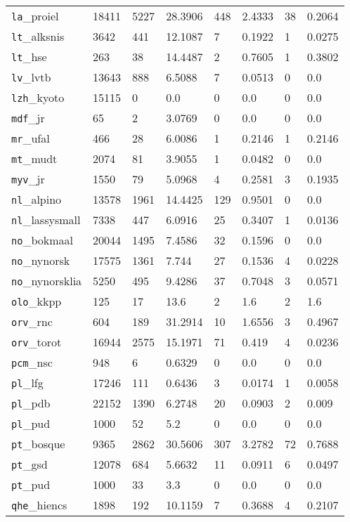 \begin{longtable}{|l|l|l|l|l|l|l|l|}
\texttt{la}\_proiel & 18411 & 5227 & 28.3906 & 448 & 2.4333 & 38 & 0.2064\\
\texttt{lt}\_alksnis & 3642 & 441 & 12.1087 & 7 & 0.1922 & 1 & 0.0275\\
\texttt{lt}\_hse & 263 & 38 & 14.4487 & 2 & 0.7605 & 1 & 0.3802\\
\texttt{lv}\_lvtb & 13643 & 888 & 6.5088 & 7 & 0.0513 & 0 & 0.0\\
\texttt{lzh}\_kyoto & 15115 & 0 & 0.0 & 0 & 0.0 & 0 & 0.0\\
\texttt{mdf}\_jr & 65 & 2 & 3.0769 & 0 & 0.0 & 0 & 0.0\\
\texttt{mr}\_ufal & 466 & 28 & 6.0086 & 1 & 0.2146 & 1 & 0.2146\\
\texttt{mt}\_mudt & 2074 & 81 & 3.9055 & 1 & 0.0482 & 0 & 0.0\\
\texttt{myv}\_jr & 1550 & 79 & 5.0968 & 4 & 0.2581 & 3 & 0.1935\\
\texttt{nl}\_alpino & 13578 & 1961 & 14.4425 & 129 & 0.9501 & 0 & 0.0\\
\texttt{nl}\_lassysmall & 7338 & 447 & 6.0916 & 25 & 0.3407 & 1 & 0.0136\\
\texttt{no}\_bokmaal & 20044 & 1495 & 7.4586 & 32 & 0.1596 & 0 & 0.0\\
\texttt{no}\_nynorsk & 17575 & 1361 & 7.744 & 27 & 0.1536 & 4 & 0.0228\\
\texttt{no}\_nynorsklia & 5250 & 495 & 9.4286 & 37 & 0.7048 & 3 & 0.0571\\
\texttt{olo}\_kkpp & 125 & 17 & 13.6 & 2 & 1.6 & 2 & 1.6\\
\texttt{orv}\_rnc & 604 & 189 & 31.2914 & 10 & 1.6556 & 3 & 0.4967\\
\texttt{orv}\_torot & 16944 & 2575 & 15.1971 & 71 & 0.419 & 4 & 0.0236\\
\texttt{pcm}\_nsc & 948 & 6 & 0.6329 & 0 & 0.0 & 0 & 0.0\\
\texttt{pl}\_lfg & 17246 & 111 & 0.6436 & 3 & 0.0174 & 1 & 0.0058\\
\texttt{pl}\_pdb & 22152 & 1390 & 6.2748 & 20 & 0.0903 & 2 & 0.009\\
\texttt{pl}\_pud & 1000 & 52 & 5.2 & 0 & 0.0 & 0 & 0.0\\
\texttt{pt}\_bosque & 9365 & 2862 & 30.5606 & 307 & 3.2782 & 72 & 0.7688\\
\texttt{pt}\_gsd & 12078 & 684 & 5.6632 & 11 & 0.0911 & 6 & 0.0497\\
\texttt{pt}\_pud & 1000 & 33 & 3.3 & 0 & 0.0 & 0 & 0.0\\
\texttt{qhe}\_hiencs & 1898 & 192 & 10.1159 & 7 & 0.3688 & 4 & 0.2107\\

\end{longtable}
